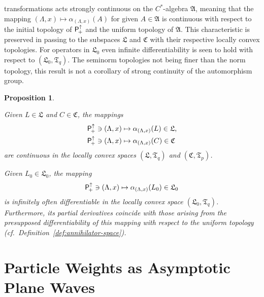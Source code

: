 \documentclass[a4paper,a4paper]{article}
\numberwithin{equation}{section}
\newcommand{\Afrak}{\mathfrak{A}}
\newcommand{\Cfrak}{\mathfrak{C}}
\newcommand{\Lfrak}{\mathfrak{L}}
\newcommand{\Tfrak}{\mathfrak{T}}
\newcommand{\Poin}{\mathsf{P}_{\negthinspace +}^\uparrow}
\newcommand{\aLax}{\alpha_{( \Lambda , x )}}
\newcounter{propitem}
\newenvironment{proplist}{\begin{list}{(\roman{propitem})}%
  {\usecounter{propitem} \setlength{\topsep}{0ex}%
   \setlength{\parsep}{0.2ex} \setlength{\itemsep}{0.4ex}%
   \setlength{\leftmargin}{0em} \setlength{\itemindent}{0.5em}%
   }}{\end{list}}
\theoremstyle{definition}
\theoremstyle{plain}
\newtheorem{proposition}[definition]{Proposition}
\theoremstyle{remark}
\begin{document}
  transformations acts strongly continuous on the $C^*$-algebra
  $\Afrak$, meaning that the mapping $( \Lambda , x ) \mapsto \aLax (
  A )$ for given $A \in \Afrak$ is continuous with respect to the
  initial topology of $\Poin$ and the uniform topology of $\Afrak$.
  This characteristic is preserved in passing to the subspaces
  $\Lfrak$ and $\Cfrak$ with their respective locally convex
  topologies. For operators in $\Lfrak_0$ even infinite
  differentiability is seen to hold with respect to $( \Lfrak_0 ,
  \Tfrak_q )$. The seminorm topologies not being finer than the norm
  topology, this result is not a corollary of strong continuity of the
  automorphism group.
  \begin{proposition}
    \label{pro:lcs-continuity-differentiability}
    \begin{proplist}
    \item Given $L \in \Lfrak$ and $C \in \Cfrak$, the mappings
      \begin{align*}
        \Poin \ni ( \Lambda , x ) & \mapsto \aLax ( L ) \in \Lfrak
        \text{,} \\
        \Poin \ni ( \Lambda , x ) & \mapsto \aLax ( C ) \in \Cfrak
      \end{align*}
      are continuous in the locally convex spaces $( \Lfrak , \Tfrak_q
      )$ and $( \Cfrak , \Tfrak_p )$.
    \item Given $L_0 \in \Lfrak_0$, the mapping
      \begin{equation*}
        \Poin \ni ( \Lambda , x ) \mapsto \aLax ( L_0 ) \in \Lfrak_0
      \end{equation*}
      is infinitely often differentiable in the locally convex space
      $( \Lfrak_0 , \Tfrak_q )$.  Furthermore, its partial derivatives
      coincide with those arising from the presupposed
      differentiability of this mapping with respect to the uniform
      topology (cf.~Definition~\ref{def:annihilator-space}).
    \end{proplist}
  \end{proposition}


\section{Particle Weights as Asymptotic Plane Waves}
  \label{sec:particle-weights}
  
\end{document}
